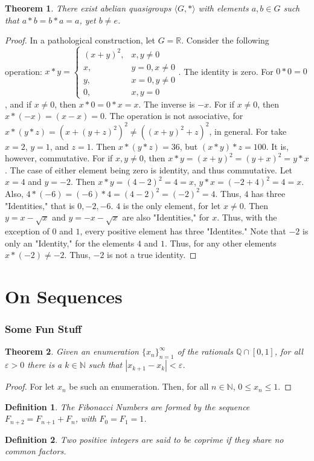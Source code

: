 \documentclass[oneside]{book}
\theoremstyle{mystyle}
\newtheorem{theorem}{Theorem}[section]
\newtheorem{definition}{Definition}[section]
\begin{document}
\begin{theorem}
There exist abelian quasigroups $\langle G,*\rangle$ with elements $a,b\in G$ such that $a*b = b*a = a$, yet $b\ne e$.
\end{theorem}
\begin{proof}
In a pathological construction, let $G=\mathbb{R}$. Consider the following operation:
$x* y = \begin{cases} (x+y)^2, & x,y\ne 0 \\ x, & y=0,x\ne 0 \\ y, & x=0,y\ne 0 \\ 0, & x,y=0 \end{cases}$.
The identity is zero. For $0*0 = 0$, and if $x\ne 0$, then $x*0 = 0*x = x$. The inverse is $-x$. For if $x\ne 0$, then $x*(-x) = (x-x)=0$. The operation is not associative, for $x*(y*z) = (x+(y+z)^2)^2 \ne ((x+y)^2+z)^2$, in general. For take $x=2$, $y=1$, and $z=1$. Then $x*(y*z) = 36$, but $(x*y)*z = 100$. It is, however, commutative. For if $x,y \ne 0$, then $x*y = (x+y)^2 = (y+x)^2 = y*x$. The case of either element being zero is identity, and thus commutative. Let $x=4$ and $y=-2$. Then $x*y = (4-2)^2 = 4=x$, $y*x = (-2+4)^2 = 4 = x$. Also, $4*(-6) = (-6)*4 = (4-2)^2 = (-2)^2 = 4$. Thus, $4$ has three "Identities," that is $0,-2,-6$. $4$ is the only element, for let $x \ne 0$. Then $y = x-\sqrt{x}$ and $y=-x-\sqrt{x}$ are also "Identities," for $x$. Thus, with the exception of $0$ and $1$, every positive element has three "Identites." Note that $-2$ is only an "Identity," for the elements $4$ and $1$. Thus, for any other elements $x*(-2) \ne -2$. Thus, $-2$ is not a true identity.
\end{proof}
%
\section{On Sequences}
%
\subsubsection{Some Fun Stuff}
%
\begin{theorem}
Given an enumeration $\{x_n\}_{n=1}^{\infty}$ of the rationals $\mathbb{Q}\cap [0,1]$, for all $\varepsilon>0$ there is a $k\in \mathbb{N}$ such that $|x_{k+1}-x_k|<\varepsilon$.
\end{theorem}
\begin{proof}
For let $x_n$ be such an enumeration. Then, for all $n\in \mathbb{N}$, $0 \leq x_n \leq 1$.
\end{proof}
%
\begin{definition}
The Fibonacci Numbers are formed by the sequence $F_{n+2}=F_{n+1}+F_{n}$, with $F_0=F_1 = 1$.
\end{definition}
%
\begin{definition}
Two positive integers are said to be coprime if they share no common factors.
\end{definition}
\end{document}
